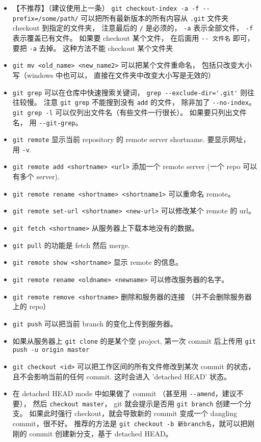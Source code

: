 \begin{itemize}
\item 【不推荐】（建议使用上一条） \verb`git checkout-index -a -f --prefix=/some/path/` 可以把所有最新版本的所有内容从 \verb`.git` 文件夹 checkout 到指定的文件夹， 注意最后的 \verb`/` 是必须的， \verb`-a` 表示全部文件， \verb`-f` 表示覆盖已有文件。 如果要 checkout 某个文件， 在后面用 \verb`-- 文件名` 即可， 要把 \verb`-a` 去掉。 这种方法不能 checkout 某个文件夹
\item \verb`git mv <old_name> <new_name2>` 可以把某个文件重命名， 包括只改变大小写（windows 中也可以， 直接在文件夹中改变大小写是无效的）
\item \verb`git grep` 可以在仓库中快速搜索关键词， \verb`grep --exclude-dir='.git'` 则往往较慢。 注意 \verb`git grep` 不能搜到没有 \verb`add` 的文件， 除非加了 \verb`--no-index`。 \verb`git grep -l` 可以仅列出文件名（有些文件一行很长）。 如果要只列出文件名， 用 \verb`--git-grep`。
\item \verb`git remote` 显示当前 repository 的 remote server shortname. 要显示网址， 用 \verb`-v`.
\item \verb`git remote add <shortname> <url>` 添加一个 remote server (一个 repo 可以有多个 server).
\item \verb`git remote rename <shortname> <shortname1>` 可以重命名 remote。
\item \verb`git remote set-url <shortname> <new-url>` 可以修改某个 remote 的 url。
\item \verb`git fetch <shortname>` 从服务器上下载本地没有的数据。
\item \verb`git pull` 的功能是 fetch 然后 merge.
\item \verb`git remote show <shortname>` 显示 remote 的信息。
\item \verb`git remote rename <oldname> <newname>` 可以修改服务器的名字。
\item \verb`git remote remove <shortname>` 删除和服务器的连接 （并不会删除服务器上的 repo）
\item \verb`git push` 可以把当前 branch 的变化上传到服务器。
\item 如果从服务器上 \verb`git clone` 的是某个空 project, 第一次 commit 后上传用 \verb`git push -u origin master`
\item \verb`git checkout <id>` 可以把工作区间的所有文件修改到某次 commit 的状态， 且不会影响当前的任何 commit. 这时会进入 'detached HEAD' 状态。
\item 在 detached HEAD mode 中如果做了 commit （甚至用 \verb`--amend`，建议不要）， 然后 \verb`checkout master`， git 就会提示是否用 \verb`git branch` 创建一个分支。 如果此时强行 checkout，就会导致新的 commit 变成一个 dangling commit，很不好。 推荐的方法是 \verb`git checkout -b 新branch名`，就可以把刚刚的 commit 创建新分支，基于 detached HEAD。

\end{itemize}
